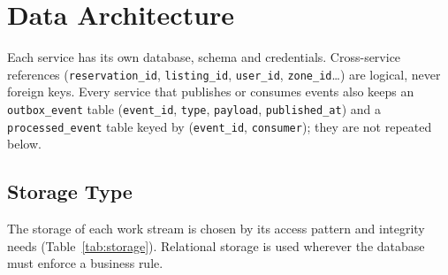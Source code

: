 \section{Data Architecture}

Each service has its own database, schema and credentials. Cross-service
references (\texttt{reservation\_id}, \texttt{listing\_id}, \texttt{user\_id},
\texttt{zone\_id}\ldots) are logical, never foreign keys. Every service that
publishes or consumes events also keeps an \texttt{outbox\_event} table
(\texttt{event\_id}, \texttt{type}, \texttt{payload}, \texttt{published\_at})
and a \texttt{processed\_event} table keyed by (\texttt{event\_id},
\texttt{consumer}); they are not repeated below.

\subsection{Storage Type}

The storage of each work stream is chosen by its access pattern and integrity
needs (Table~\ref{tab:storage}). Relational storage is used wherever the
database must enforce a business rule.

